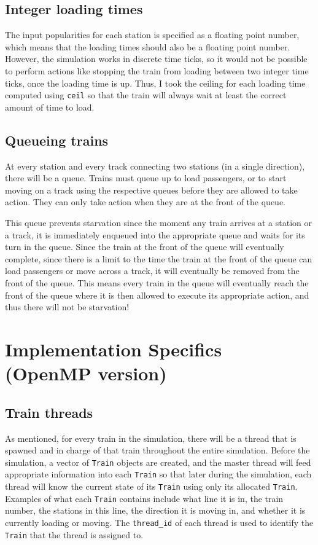 \documentclass[12pt]{article}
\begin{document}
\subsection{Integer loading times}

The input popularities for each station is specified as a floating point number, which means that the loading times should also be a floating point number. However, the simulation works in discrete time ticks, so it would not be possible to perform actions like stopping the train from loading between two integer time ticks, once the loading time is up. Thus, I took the ceiling for each loading time computed using \verb!ceil! so that the train will always wait at least the correct amount of time to load.

\subsection{Queueing trains}

At every station and every track connecting two stations (in a single direction), there will be a queue. Trains must queue up to load passengers, or to start moving on a track using the respective queues before they are allowed to take action. They can only take action when they are at the front of the queue.

\bigbreak \noindent This queue prevents starvation since the moment any train arrives at a station or a track, it is immediately enqueued into the appropriate queue and waits for its turn in the queue. Since the train at the front of the queue will eventually complete, since there is a limit to the time the train at the front of the queue can load passengers or move across a track, it will eventually be removed from the front of the queue. This means every train in the queue will eventually reach the front of the queue where it is then allowed to execute its appropriate action, and thus there will not be starvation!

\section{Implementation Specifics (OpenMP version)}

\subsection{Train threads}

As mentioned, for every train in the simulation, there will be a thread that is spawned and in charge of that train throughout the entire simulation. Before the simulation, a vector of \verb!Train! objects are created, and the master thread will feed appropriate information into each \verb!Train! so that later during the simulation, each thread will know the current state of its \verb!Train! using only its allocated \verb!Train!. Examples of what each \verb!Train! contains include what line it is in, the train number, the stations in this line, the direction it is moving in, and whether it is currently loading or moving. The \verb!thread_id! of each thread is used to identify the \verb!Train! that the thread is assigned to.
\end{document}
